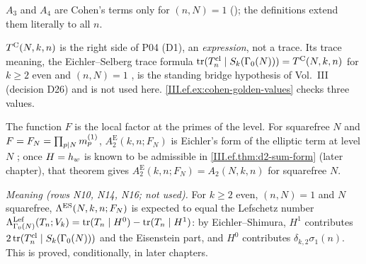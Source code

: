 \begin{definition}
\end{definition}

\begin{definition}
\end{definition}
\noindent $A_3$ and $A_4$ are Cohen's terms only for $(n,N)=1$ (\cite[Thm.~12.4.11]{CoSt}); the definitions extend them literally to all $n$.

\begin{definition}
\end{definition}
\noindent $T^{\mathrm{C}}(N,k,n)$ is the right side of P04 (D1), an \emph{expression}, not a trace. Its trace meaning, the Eichler--Selberg trace formula
$\operatorname{tr}(T^{\mathrm{cl}}_n\mid S_{k}(\Gamma_0(N)))=T^{\mathrm{C}}(N,k,n)$ for $k\ge2$ even and $(n,N)=1$ \cite[Thm.~12.4.11, pp.~477--478]{CoSt}, is the standing bridge hypothesis of
Vol.~III (decision D26) and is not used here. \cref{III.ef.ex:cohen-golden-values} checks three values.

\begin{definition}
\end{definition}
\noindent The function $F$ is the local factor at the primes of the level. For squarefree $N$ and $F=F_N=\prod_{p\mid N}m^{(1)}_p$, $A_2^{\mathrm E}(k,n;F_N)$ is
Eichler's form of the elliptic term at level $N$ \cite[Prop.~3.1]{Shz}; once $H=h_w$ is known to be admissible in \cref{III.ef.thm:d2-sum-form}
(later chapter), that theorem gives $A_2^{\mathrm E}(k,n;F_N)=A_2(N,k,n)$ for squarefree $N$.

\begin{definition}
\end{definition}
\noindent \emph{Meaning (rows N10, N14, N16; not used).} For $k\ge2$ even, $(n,N)=1$ and $N$ squarefree, $\Lambda^{\mathrm{ES}}(N,k,n;F_N)$ is expected to equal the
Lefschetz number $\Lambda^{\mathrm{Lef}}_{\Gamma_0(N)}(T_n;V_k)=\operatorname{tr}(T_n\mid H^0)-\operatorname{tr}(T_n\mid H^1)$: by Eichler--Shimura, $H^1$ contributes $2\operatorname{tr}(T^{\mathrm{cl}}_n\mid S_{k}(\Gamma_0(N)))$ and the
Eisenstein part, and $H^0$ contributes $\delta_{k,2}\sigma_1(n)$. This is proved, conditionally, in later chapters.

